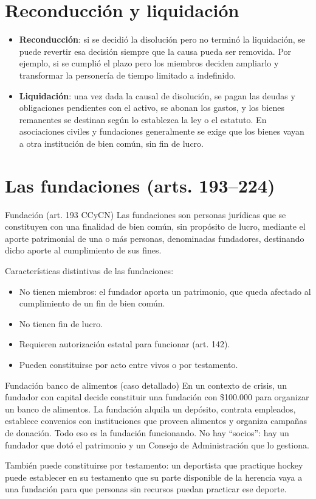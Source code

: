 \documentclass[12pt,oneside]{book}
\begin{document}
\section{Reconducción y liquidación}

\begin{itemize}
    \item \textbf{Reconducción}: si se decidió la disolución pero no terminó la liquidación, se puede revertir esa decisión siempre que la causa pueda ser removida. Por ejemplo, si se cumplió el plazo pero los miembros deciden ampliarlo y transformar la personería de tiempo limitado a indefinido.
    \item \textbf{Liquidación}: una vez dada la causal de disolución, se pagan las deudas y obligaciones pendientes con el activo, se abonan los gastos, y los bienes remanentes se destinan según lo establezca la ley o el estatuto. En asociaciones civiles y fundaciones generalmente se exige que los bienes vayan a otra institución de bien común, sin fin de lucro.
\end{itemize}

\section{Las fundaciones (arts. 193--224)}

\begin{definition}{Fundación (art. 193 CCyCN)}
Las fundaciones son personas jurídicas que se constituyen con una finalidad de bien común, sin propósito de lucro, mediante el aporte patrimonial de una o más personas, denominadas fundadores, destinando dicho aporte al cumplimiento de sus fines.
\end{definition}

Características distintivas de las fundaciones:

\begin{itemize}
    \item No tienen miembros: el fundador aporta un patrimonio, que queda afectado al cumplimiento de un fin de bien común.
    \item No tienen fin de lucro.
    \item Requieren autorización estatal para funcionar (art. 142).
    \item Pueden constituirse por acto entre vivos o por testamento.
\end{itemize}

\begin{example}{Fundación banco de alimentos (caso detallado)}
En un contexto de crisis, un fundador con capital decide constituir una fundación con \$100.000 para organizar un banco de alimentos. La fundación alquila un depósito, contrata empleados, establece convenios con instituciones que proveen alimentos y organiza campañas de donación. Todo eso es la fundación funcionando. No hay ``socios'': hay un fundador que dotó el patrimonio y un Consejo de Administración que lo gestiona.

También puede constituirse por testamento: un deportista que practique hockey puede establecer en su testamento que su parte disponible de la herencia vaya a una fundación para que personas sin recursos puedan practicar ese deporte.
\end{example}
\end{document}
